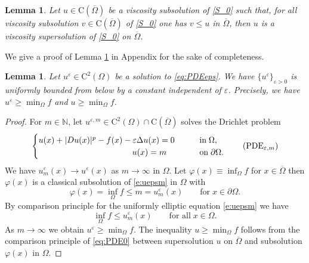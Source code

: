 \documentclass[11pt,reqno]{amsart}
\numberwithin{figure}{section}
\theoremstyle{plain}
\newtheorem{lem}[thm]{Lemma}
\theoremstyle{remark}
\numberwithin{equation}{section}
\newcommand{\rmC}{\mathrm{C}}
\begin{document}
\begin{lem}\label{lem:max} Let $u\in \rmC(\overline{\Omega})$ be a viscosity subsolution of \eqref{S_0} such that, for all viscosity subsolution $v\in \rmC(\overline{\Omega})$ of \eqref{S_0} one has $v\leq u$ in $\overline{\Omega}$, then $u$ is a viscosity supersolution of \eqref{S_0} on $\overline{\Omega}$.
\end{lem}
\noindent We give a proof of Lemma \ref{lem:max} in Appendix for the sake of completeness. 

\begin{lem}\label{lem:lower-bound} Let $u^\varepsilon\in \mathrm{C}^2(\Omega)$ be a solution to \eqref{eq:PDEeps}. We have $\{  u^\varepsilon\}_{\varepsilon>0}$ is uniformly bounded from below by a constant independent of $\varepsilon$. Precisely, we have $  u^\varepsilon \geq \min_\Omega f$ and $  u\geq \min_\Omega f$.
\end{lem}
\begin{proof} For $m\in \mathbb{N}$, let $u^{\varepsilon,m}\in \mathrm{C}^2(\Omega)\cap \rmC(\overline{\Omega})$ solves the Drichlet problem
\begin{equation}\label{e:uepsm}
    \begin{cases}
      u(x) + |Du(x)|^p - f(x) - \varepsilon \Delta u(x) = 0 &\qquad
    \text{in}\;\Omega, \vspace{0cm}\\
    \;\qquad\quad\qquad\qquad\qquad\qquad u(x) = m &\qquad
    \text{on}\;\partial\Omega.
    \end{cases} \tag{PDE$_{\varepsilon,m}$}
\end{equation}
We have $u^{\varepsilon}_m(x) \to u^\varepsilon(x)$ as $m\to \infty$ in $\Omega$. Let $\varphi(x) \equiv  \inf_{\Omega} f$ for $x\in \overline{\Omega}$ then $\varphi(x)$ is a classical subsolution of \eqref{e:uepsm} in $\Omega$ with
\begin{equation*}
    \varphi(x) =   \inf_\Omega f \leq m = u^\varepsilon_m(x) \qquad\text{for}\;x\in \partial\Omega.
\end{equation*}
By comparison principle for the uniformly elliptic equation \eqref{e:uepsm} we have
\begin{equation*}
     \inf_\Omega f \leq u^{\varepsilon}_m(x) \qquad\text{for all}\;x\in \Omega.
\end{equation*}
As $m\to \infty$ we obtain $  u^\varepsilon \geq \min_\Omega f$. The inequality $  u\geq \min_{\Omega}f$ follows from the comparison principle of \eqref{eq:PDE0} between supersolution $u$ on $\overline{\Omega}$ and subsolution $\varphi(x)$ in $\Omega$.
\end{proof}
\end{document}
